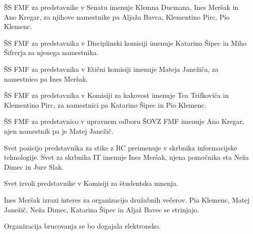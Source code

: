 \documentclass{seja}
\begin{document}
\begin{ad}
  \begin{sklep*}
    ŠS FMF za predstavnike v Senatu imenuje Klemna Ducmana, Ines Meršak in Ano Kregar, za njihove
    namestnike pa Aljaža Bavca, Klementino Pirc, Pio Klemenc.
  \end{sklep*}

  \begin{sklep*}
    ŠS FMF za predstavnika v Disciplinski komisiji imenuje Katarino Šipec in Miho Šifrerja za
    njenega namestnika.
  \end{sklep*}

  \begin{sklep*}
    ŠS FMF za predstavnika v Etični komisiji imenuje Mateja Janežiča, za namestnico pa Ines Meršak.
  \end{sklep*}

  \begin{sklep*}
    ŠS FMF za predstavnika v Komisiji za kakovost imenuje Tea Trifkoviča in Klementino Pirc, za namestnici pa Katarino Šipec in Pio Klemenc.
  \end{sklep*}

  \begin{sklep*}
    ŠS FMF za predstavnico v upravnem odboru ŠOVZ FMF imenuje Ano Kregar, njen namestnik pa je Matej
    Janežič.
  \end{sklep*}

  \begin{sklep*}
    Svet pozicijo predstavnika za stike z RC preimenuje v skrbnika informacijske tehnologije.
    Svet za skrbnika IT imenuje Ines Meršak, njena pomočnika sta Neža Dimec in Jure Slak.
  \end{sklep*}

  \begin{sklep*}
    Svet izvoli predstavnike v Komisiji za študentska mnenja.
  \end{sklep*}

\item
  Ines Meršak izrazi interes za organizacijo družabnih večerov.
  Pia Klemenc, Matej Janežič, Neža Dimec, Katarina Šipec in Aljaž Bavec se strinjajo.

  Organizacija brucovanja se bo dogajala elektronsko.
\end{ad}

\makeatletter \global\let\@enddocumenthook\@empty \makeatother
{}
\end{document}
